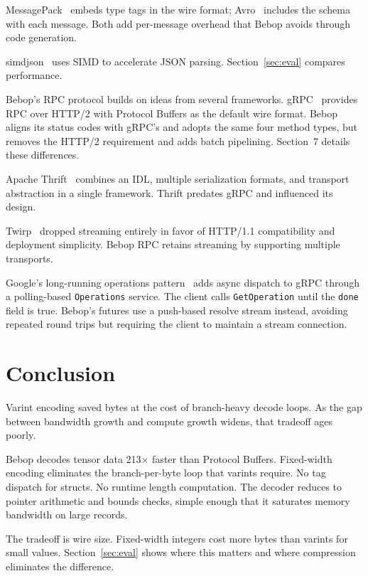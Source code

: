 \documentclass[10pt,onecolumn]{article}
\begin{document}
MessagePack~\cite{msgpack} embeds type tags in the wire format; Avro~\cite{avro} includes the schema with each message. Both add per-message overhead that Bebop avoids through code generation.

simdjson~\cite{simdjson} uses SIMD to accelerate JSON parsing. Section~\ref{sec:eval} compares performance.

Bebop's RPC protocol builds on ideas from several frameworks. gRPC~\cite{grpc-http2-spec} provides RPC over HTTP/2 with Protocol Buffers as the default wire format. Bebop aligns its status codes with gRPC's and adopts the same four method types, but removes the HTTP/2 requirement and adds batch pipelining. Section~7 details these differences.

Apache Thrift~\cite{slee-thrift} combines an IDL, multiple serialization formats, and transport abstraction in a single framework. Thrift predates gRPC and influenced its design.

Twirp~\cite{nelson-twirp} dropped streaming entirely in favor of HTTP/1.1 compatibility and deployment simplicity. Bebop RPC retains streaming by supporting multiple transports.

Google's long-running operations pattern~\cite{google-lro} adds async dispatch to gRPC through a polling-based \texttt{Operations} service. The client calls \texttt{GetOperation} until the \texttt{done} field is true. Bebop's futures use a push-based resolve stream instead, avoiding repeated round trips but requiring the client to maintain a stream connection.


\section{Conclusion}

Varint encoding saved bytes at the cost of branch-heavy decode loops. As the gap between bandwidth growth and compute growth widens, that tradeoff ages poorly.

Bebop decodes tensor data 213$\times$ faster than Protocol Buffers. Fixed-width encoding eliminates the branch-per-byte loop that varints require. No tag dispatch for structs. No runtime length computation. The decoder reduces to pointer arithmetic and bounds checks, simple enough that it saturates memory bandwidth on large records.

The tradeoff is wire size. Fixed-width integers cost more bytes than varints for small values. Section~\ref{sec:eval} shows where this matters and where compression eliminates the difference.
\end{document}
